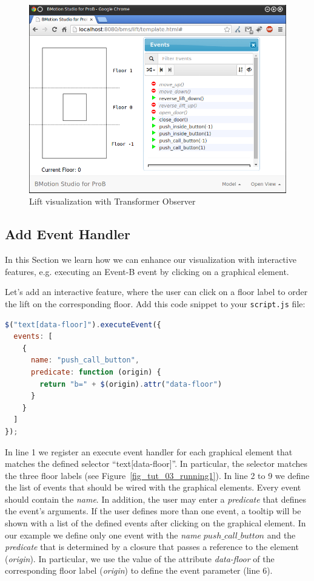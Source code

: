 \begin{figure}[!ht]
\begin{center}
	\includegraphics[width=12cm]{img/tutorial/tut_04.png}
	\caption{Lift visualization with Transformer Observer}
	\label{fig_tut_04_running2}
\end{center}
\end{figure}

\subsection{Add Event Handler}

In this Section we learn how we can enhance our visualization with interactive features, e.g. executing an Event-B event by clicking on a graphical element.

Let's add an interactive feature, where the user can click on a floor label to order the lift on the corresponding floor.
Add this code snippet to your \texttt{script.js} file:
\newpage
\begin{lstlisting}[language=JavaScript, caption={Example of an Interactive Feature (JavaScript)}]
$("text[data-floor]").executeEvent({
  events: [
    {
      name: "push_call_button", 
      predicate: function (origin) {
        return "b=" + $(origin).attr("data-floor")
      }
    }
  ]
});
\end{lstlisting}

In line 1 we register an execute event handler for each graphical element that matches the defined selector ``text[data-floor]''.
In particular, the selector matches the three floor labels (see Figure~\ref{fig_tut_03_running1}).
In line 2 to 9 we define the list of events that should be wired with the graphical elements.
Every event should contain the \textit{name}.
In addition, the user may enter a \textit{predicate} that defines the event's arguments.
If the user defines more than one event, a tooltip will be shown with a list of the defined events after clicking on the graphical element.
In our example we define only one event with the \textit{name} $push\_call\_button$ and the \textit{predicate} that is determined by a closure that passes a reference to the element (\textit{origin}).
In particular, we use the value of the attribute \textit{data-floor} of the corresponding floor label (\textit{origin}) to define the event parameter (line 6).

